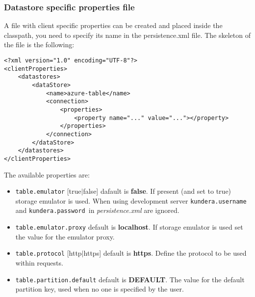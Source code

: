 \subsubsection{Datastore specific properties file}
A file with client specific properties can be created and placed inside the classpath, you need to specify its name in the persistence.xml file.
The skeleton of the file is the following:

\begin{verbatim}
<?xml version="1.0" encoding="UTF-8"?>
<clientProperties>
    <datastores>
        <dataStore>
            <name>azure-table</name>
            <connection>
                <properties>
                    <property name="..." value="..."></property>
                </properties>
            </connection>
        </dataStore>
    </datastores>
</clientProperties>
\end{verbatim}

\noindent The available properties are:
\begin{itemize}
\item \texttt{table.emulator} [true$\vert$false] dafault is \textbf{false}. If present (and set to true) storage emulator is used. When using development server \texttt{kundera.username} and \texttt{kundera.password }in \textit{persistence.xml} are ignored.
\item \texttt{table.emulator.proxy} default is \textbf{localhost}. If storage emulator is used set the value for the emulator proxy.
\item \texttt{table.protocol} [http$\vert$https] default is \textbf{https}. Define the protocol to be used within requests.
\item \texttt{table.partition.default} default is \textbf{DEFAULT}.
The value for the default partition key, used when no one is specified by the user.
\end{itemize}